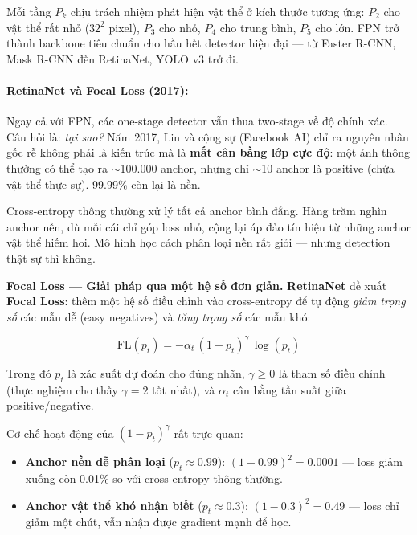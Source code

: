 Mỗi tầng $P_k$ chịu trách nhiệm phát hiện vật thể ở kích thước tương ứng: $P_2$ cho vật thể rất nhỏ ($32^2$ pixel), $P_3$ cho nhỏ, $P_4$ cho trung bình, $P_5$ cho lớn. FPN trở thành backbone tiêu chuẩn cho hầu hết detector hiện đại --- từ Faster R-CNN, Mask R-CNN đến RetinaNet, YOLO v3 trở đi.

\paragraph{RetinaNet và Focal Loss (2017):}
Ngay cả với FPN, các one-stage detector vẫn thua two-stage về độ chính xác. Câu hỏi là: \textit{tại sao?} Năm 2017, Lin và cộng sự (Facebook AI) chỉ ra nguyên nhân gốc rễ không phải là kiến trúc mà là \textbf{mất cân bằng lớp cực độ}: một ảnh thông thường có thể tạo ra $\sim$100.000 anchor, nhưng chỉ $\sim$10 anchor là positive (chứa vật thể thực sự). 99.99\% còn lại là nền.

Cross-entropy thông thường xử lý tất cả anchor bình đẳng. Hàng trăm nghìn anchor nền, dù mỗi cái chỉ góp loss nhỏ, cộng lại áp đảo tín hiệu từ những anchor vật thể hiếm hoi. Mô hình học cách phân loại nền rất giỏi --- nhưng detection thật sự thì không.

\textbf{Focal Loss --- Giải pháp qua một hệ số đơn giản.}
\textbf{RetinaNet} \cite{Lin2017RetinaNet} đề xuất \textbf{Focal Loss}: thêm một hệ số điều chỉnh vào cross-entropy để tự động \textit{giảm trọng số} các mẫu dễ (easy negatives) và \textit{tăng trọng số} các mẫu khó:

\begin{equation}
    \text{FL}(p_t) = -\alpha_t\,(1 - p_t)^{\gamma}\,\log(p_t)
\end{equation}

Trong đó $p_t$ là xác suất dự đoán cho đúng nhãn, $\gamma \geq 0$ là tham số điều chỉnh (thực nghiệm cho thấy $\gamma = 2$ tốt nhất), và $\alpha_t$ cân bằng tần suất giữa positive/negative.

Cơ chế hoạt động của $(1-p_t)^\gamma$ rất trực quan:
\begin{itemize}
    \item \textbf{Anchor nền dễ phân loại} ($p_t \approx 0.99$): $(1 - 0.99)^2 = 0.0001$ --- loss giảm xuống còn 0.01\% so với cross-entropy thông thường.
    \item \textbf{Anchor vật thể khó nhận biết} ($p_t \approx 0.3$): $(1 - 0.3)^2 = 0.49$ --- loss chỉ giảm một chút, vẫn nhận được gradient mạnh để học.
\end{itemize}

